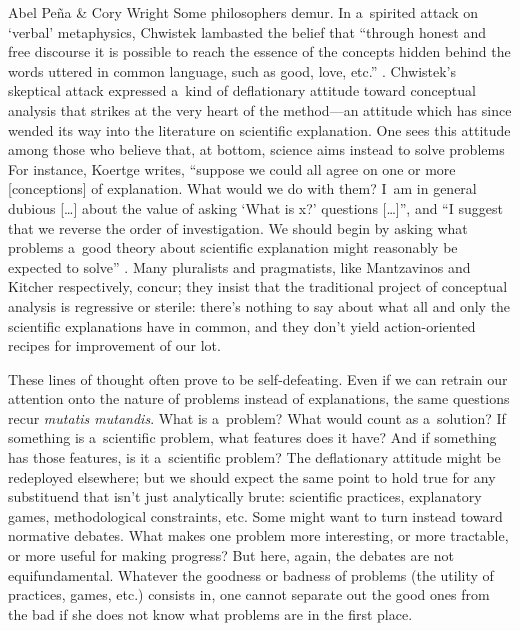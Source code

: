 \begin{editorialeng}{Abel Peña \& Cory Wright}
Some philosophers demur. In a~spirited attack on `verbal' metaphysics, Chwistek
\parencite*[][]{chwistek_tragedia_1932} %
 lambasted the belief that ``through honest and free discourse it is possible to reach the essence of the concepts hidden behind the words uttered in common language, such as good, love, etc.'' 
\parencite[][p.2]{trybus_tragedy_2017}. %
 Chwistek's skeptical attack expressed a~kind of deflationary attitude toward conceptual analysis that strikes at the very heart of the method---an attitude which has since wended its way into the literature on scientific explanation. One sees this attitude among those who believe that, at bottom, science aims instead to solve problems 
 For instance, Koertge writes, ``suppose we could all agree on one or more [conceptions] of explanation. What would we do with them? I~am in general dubious […] about the value of asking `What is x?' questions […]'', and ``I suggest that we reverse the order of investigation. We should begin by asking what problems a~good theory about scientific explanation might reasonably be expected to solve'' 
\parencite[][pp.85–86]{koertge_explanation_1992}. %
 Many pluralists and pragmatists, like Mantzavinos 
\parencite*[][p.14]{mantzavinos_explanatory_2016} %
 and Kitcher 
\parencite*[][p.60]{kitcher_whats_2023} %
 respectively, concur; they insist that the traditional project of conceptual analysis is regressive or sterile: there's nothing to say about what all and only the scientific explanations have in common, and they don't yield action-oriented recipes for improvement of our lot.

These lines of thought often prove to be self-defeating. Even if we can retrain our attention onto the nature of problems instead of explanations, the same questions recur \textit{mutatis mutandis}. What is a~problem? What would count as a~solution? If something is a~scientific problem, what features does it have? And if something has those features, is it a~scientific problem? The deflationary attitude might be redeployed elsewhere; but we should expect the same point to hold true for any substituend that isn't just analytically brute: scientific practices, explanatory games, methodological constraints, etc. Some might want to turn instead toward normative debates. What makes one problem more interesting, or more tractable, or more useful for making progress? But here, again, the debates are not equifundamental. Whatever the goodness or badness of problems (the utility of practices, games, etc.) consists in, one cannot separate out the good ones from the bad if she does not know what problems are in the first place.


\end{editorialeng}
